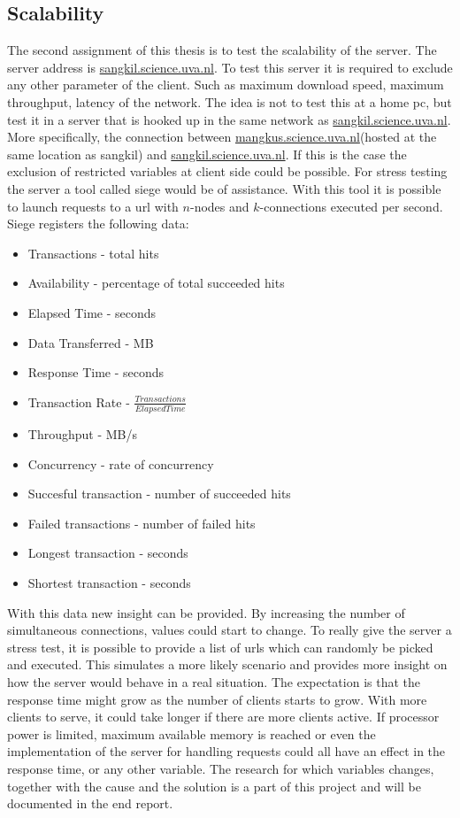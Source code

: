 \subsection{Scalability}
\label{sec:scalability}
The second assignment of this thesis is to test the scalability of the server. The server address is \url{sangkil.science.uva.nl}. To test this server it is required to exclude any other parameter of the client. Such as maximum download speed, maximum throughput, latency of the network. The idea is not to test this at a home pc, but test it in a server that is hooked up in the same network as \url{sangkil.science.uva.nl}. More specifically, the connection between \url{mangkus.science.uva.nl}(hosted at the same location as sangkil) and \url{sangkil.science.uva.nl}. If this is the case the exclusion of restricted variables at client side could be possible. 
For stress testing the server a tool called siege \cite{Siege} would be of assistance. With this tool it is possible to launch requests to a url with $n$-nodes and $k$-connections executed per second. Siege registers the following data:
\begin{itemize}
\item Transactions - total hits
\item Availability - percentage of total succeeded hits
\item Elapsed Time - seconds
\item Data Transferred - MB
\item Response Time - seconds
\item Transaction Rate - $\frac{Transactions}{Elapsed Time}$
\item Throughput - MB/s
\item Concurrency - rate of concurrency
\item Succesful transaction - number of succeeded hits
\item Failed transactions - number of failed hits
\item Longest transaction - seconds
\item Shortest transaction - seconds
\end{itemize}
With this data new insight can be provided. By increasing the number of simultaneous connections, values could start to change. To really give the server a stress test, it is possible to provide a list of urls which can randomly be picked and executed. This simulates a more likely scenario and provides more insight on how the server would behave in a real situation. The expectation is that the response time might grow as the number of clients starts to grow. With more clients to serve, it could take longer if there are more clients active. If processor power is limited, maximum available memory is reached or even the implementation of the server for handling requests could all have an effect in the response time, or any other variable. The research for which variables changes, together with the cause and the solution is a part of this project and will be documented in the end report. 


